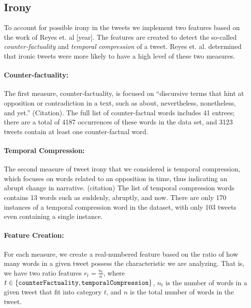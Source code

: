 
\subsection{Irony} %
\label{sub:irony}

To account for possible irony in the tweets we implement two features based on the work of Reyes et. al [year]. The features are created to detect the so-called \textit{counter-factuality} and \textit{temporal compression} of a tweet. Reyes et. al. determined that ironic tweets were more likely to have a high level of these two measures.

\paragraph{Counter-factuality:} %
\label{par:counter_factuality_}
The first measure, counter-factuality, is focused on ``discursive terms that hint at opposition or contradiction in a text, such as about, nevertheless, nonetheless, and yet.'' (Citation). The full list of counter-factual words includes 41 entrees; there are a total of 4187 occurrences of these words in the data set, and 3123 tweets contain at least one counter-factual word.

\paragraph{Temporal Compression:} %
\label{par:temporal_compression_}
The second measure of tweet irony that we considered is temporal compression, which focuses on words related to an opposition in time, thus indicating an abrupt change in narrative. (citation) The list of temporal compression words contains 13 words such as suddenly, abruptly, and now. There are only 170 instances of a temporal compression word in the dataset, with only 103 tweets even containing a single instance.

\paragraph{Feature Creation:} %
\label{par:feature_creation_}
For each measure, we create a real-numbered feature based on the ratio of how many words in a given tweet possess the characteristic we are analyzing. That is, we have two ratio features $r_t = \frac{n_t}{n}$, where $t \in \left \{\hbox{\tt counterFactuality}, \hbox{\tt temporalCompression}\right \}$, $n_t$ is the number of words in a given tweet that fit into category $t$, and $n$ is the total number of words in the tweet.

